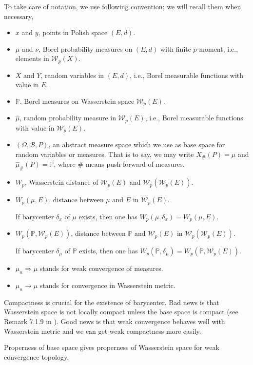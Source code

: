 To take care of notation, we use following convention; we will recall them when necessary,
\begin{itemize}
	\item $x$ and $y$, points in Polish space $(E,d)$.
	\item $\mu$ and $\nu$, Borel probability measures on $(E,d)$ with finite $p$-moment, i.e., elements in $\mathcal{W}_p(X)$.
	\item $X$ and $Y$, random variables in $(E, d)$, i.e., Borel measurable functions with value in $E$.
	\item $\mathbb{P}$, Borel measures on Wasserstein space $\mathcal{W}_p(E)$.
	\item \( \hat{\mu} \), random probability measure in $\mathcal{W}_p(E)$, i.e., Borel measurable functions with value in $\mathcal{W}_p(E)$.
	\item $(\Omega, \mathcal{B}, P)$, an abstract measure space which we use as base space for random variables or measures. That is to say, we may write $X_{\#}(P)=\mu$ and $\hat{\mu}_{\#}(P)=\mathbb{P}$, where \# means push-forward of measures.
	\item $W_p$, Wasserstein distance of $\mathcal{W}_p(E)$ and $\mathcal{W}_p(\mathcal{W}_p(E))$.
	\item $W_p(\mu, E)$, distance between $\mu$ and $E$ in $\mathcal{W}_p(E)$.

	      If barycenter $\delta_x$ of $\mu$ exists, then one has $W_p(\mu, \delta_x)=W_p(\mu, E)$.
	\item $W_p(\mathbb{P}, \mathcal{W}_p(E))$, distance between $\mathbb{P}$ and $\mathcal{W}_p(E)$ in $\mathcal{W}_p(\mathcal{W}_p(E))$.

	      If barycenter $\delta_\mu$ of $\mathbb{P}$ exists, then one has $W_p(\mathbb{P}, \delta_\mu)=W_p(\mathbb{P}, \mathcal{W}_p(E))$.
	\item $\mu_n \Rightarrow \mu$ stands for weak convergence of measures.
	\item $\mu_n \rightarrow \mu$ stands for convergence in Wasserstein metric.

\end{itemize}

Compactness is crucial for the existence of barycenter. Bad news is that Wasserstein space is not locally compact unless the base space is compact (see Remark 7.1.9 in \cite{Ambrosio2005}). Good news is that weak convergence behaves well with Wasserstein metric and we can get weak compactness more easily.

Properness of base space gives properness of Wasserstein space for weak convergence topology.

